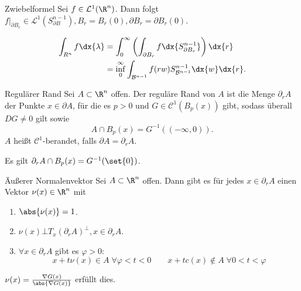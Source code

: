 \begin{karte}{Zwiebelformel}
    Sei \( f\in \mathcal{L}^1(\R^n) \). Dann folgt \( f|_{\partial B_r} \in \mathcal{L}^1(S_{\partial B}^{n-1}), 
    B_r = B_r(0), \partial B_r = \partial B_r(0) \).

    \begin{align*}
        \int_{R^n} f \dx{\lambda} &= \int_0^\infty \left( \int_{\partial B_r} f \dx{S_{\partial B_r}^{n-1}} \right) \dx{r} \\
        &= \inf_0^\infty \int_{\mathcal{B}^{n-1}} f(r w) S_{\mathcal{B}^{n-1}}^{n-1} \dx{w} \dx{r}.
    \end{align*} 

\end{karte}

\begin{karte}{Regulärer Rand}
    Sei \(A\subset \R^n\) offen. Der reguläre Rand von \(A\) ist die Menge \( \partial_r A \) 
    der Punkte \(x \in \partial A\), für die es \( p > 0 \) und \( G \in \mathcal{C}^1(B_p(x)) \) gibt, 
    sodass überall \( DG \neq 0 \) gilt sowie 
    \[ A \cap B_{p}(x) = G^{-1}((-\infty,0)). \]
    \(A\) heißt \(\mathcal{C}^1\)-berandet, falls \( \partial A = \partial_r A \).

    Es gilt \( \partial_r A \cap B_p (x) = G^{-1}(\set{0}) \).
\end{karte}

\begin{karte}{Äußerer Normalenvektor}
    Sei \( A\subset \R^n \) offen. Dann gibt es für jedes \( x\in \partial_r A \) einen Vektor 
    \( \nu(x) \in \R^n \) mit 
    \begin{enumerate}
        \item \(\abs{\nu(x)} = 1\).
        \item \( \nu(x) \bot T_x(\partial_r A)^\bot, x \in \partial_r A \).
        \item \( \forall x \in \partial_r A \) gibt es \( \varphi > 0 \):
        \[ x + t\nu(x) \in A \;\forall \varphi < t < 0 \qquad x + tc(x) \notin A \;\forall 0 < t < \varphi \]
    \end{enumerate}
    \( \nu(x) = \frac{\nabla G(x)}{ \abs{ \nabla G(x) }} \) erfüllt dies.
\end{karte}